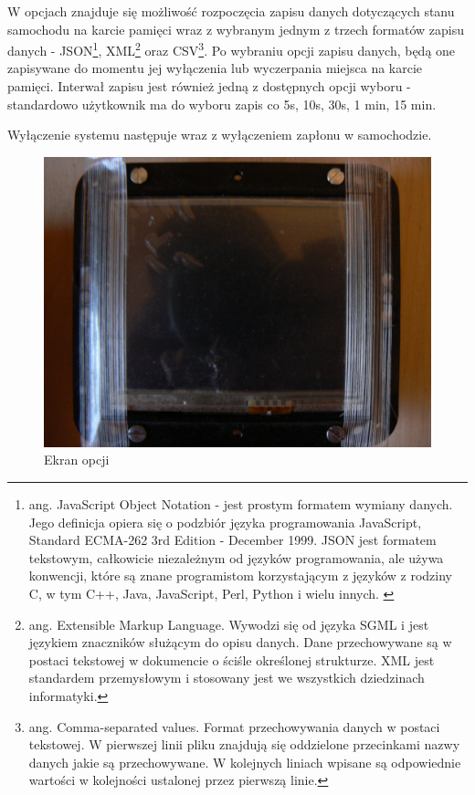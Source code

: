 \documentclass{xmgr}
\begin{document}
W opcjach znajduje się możliwość rozpoczęcia zapisu danych dotyczących stanu samochodu na karcie pamięci wraz z wybranym jednym z trzech formatów zapisu danych - JSON\footnote{ang. JavaScript Object Notation - jest prostym formatem wymiany danych. Jego definicja opiera się o podzbiór języka programowania JavaScript, Standard ECMA-262 3rd Edition - December 1999. JSON jest formatem tekstowym, całkowicie niezależnym od języków programowania, ale używa konwencji, które są znane programistom korzystającym z języków z rodziny C, w tym C++, Java, JavaScript, Perl, Python i wielu innych. \cite{JSON}}, XML\footnote{ang. Extensible Markup Language. Wywodzi się od języka SGML i jest językiem znaczników służącym do opisu danych. Dane przechowywane są w postaci tekstowej w dokumencie o ściśle określonej strukturze. XML jest standardem przemysłowym i stosowany jest we wszystkich dziedzinach informatyki.\cite{XML}} oraz CSV\footnote{ang. Comma-separated values. Format przechowywania danych w postaci tekstowej. W pierwszej linii pliku znajdują się oddzielone przecinkami nazwy danych jakie są przechowywane. W kolejnych liniach wpisane są odpowiednie wartości w kolejności ustalonej przez pierwszą linie.}. Po wybraniu opcji zapisu danych, będą one zapisywane do momentu jej wyłączenia lub wyczerpania miejsca na karcie pamięci. Interwał zapisu jest również jedną z dostępnych opcji wyboru - standardowo użytkownik ma do wyboru zapis co 5s, 10s, 30s, 1 min, 15 min.

Wyłączenie systemu następuje wraz z wyłączeniem zapłonu w samochodzie. 

\begin{figure}[!h]
    \centering
    	\includegraphics[height=0.3\textheight]{images/opcje.JPG}
    \caption{Ekran opcji}
\end{figure}
\end{document}
